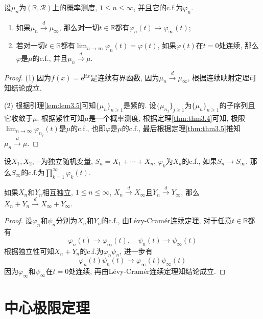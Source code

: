 \documentclass[cn, 12pt, math=mtpro2, bibstyle=apa, blue, twocol]{elegantbook}
\newcommand{\R}{\mathbb{R}}
\newcommand{\limn}{\lim_{n\to\infty}}
\begin{document}
\begin{theorem}
  设$\mu_n$为$(\R,\mathcal{R})$上的概率测度, $1\leq n\leq\infty$, 并且它的c.f.为$\varphi_n$.
  \begin{enumerate}[label=(\arabic*)]
  \item 如果$\mu_n\xrightarrow{d}\mu_\infty$, 那么对一切$t\in\R$都有$\varphi_n(t)\to \varphi_\infty(t)$;
  \item 若对一切$t\in\R$都有$\limn \varphi_n(t)=\varphi(t)$, 如果$\varphi(t)$在$t=0$处连续, 那么$\varphi$是$\mu$的c.f., 并且$\mu_n\xrightarrow{d}\mu$.
\end{enumerate}
\end{theorem}
\begin{proof}
  (1) 因为$f(x)=\text{e}^{\text{i}tx}$是连续有界函数, 因为$\mu_n\xrightarrow{d}\mu_\infty$, 根据连续映射定理可知结论成立.

  (2) 根据引理\ref{lem:lem3.5}可知$\{\mu_n\}_{n\ge1}$是紧的. 设$\{\mu_{n_j}\}_{j\ge1}$为$\{\mu_n\}_{n\ge1}$的子序列且它收敛于$\mu$. 根据紧性可知$\mu$是一个概率测度, 根据定理\ref{thm:thm3.4}可知, 极限$\limn \varphi_{n_j}(t)$是$\mu$的c.f., 也即$\varphi$是$\mu$的c.f., 最后根据定理\ref{thm:thm3.5}推知$\mu_n\xrightarrow{d}\mu$.
\end{proof}
\begin{example}
设$X_1,X_2,\cdots$为独立随机变量, $S_n=X_1+\cdots+X_n$, $\varphi_k$为$X_k$的c.f., 如果$S_n\to S_\infty$, 那么$S_\infty$的c.f.为$\prod_{k=1}^{\infty}\varphi_k(t)$.
\end{example}

\begin{example}
如果$X_n$和$Y_n$相互独立, $1\leq n\leq \infty$,  $X_n\xrightarrow{d}X_\infty$且$Y_n\xrightarrow{d}Y_\infty$, 那么$X_n+Y_n\xrightarrow{d}X_\infty+Y_\infty$.
\end{example}
\begin{proof}
  设$\varphi_n$和$\psi_n$分别为$X_n$和$Y_n$的c.f., 由Lévy-Cramér连续定理, 对于任意$t\in\R$都有
  $$\varphi_n(t)\to\varphi_\infty(t),\quad \psi_n(t)\to\psi_\infty(t)$$
  根据独立性可知$X_n+Y_n$的c.f.为$\varphi_n\psi_n$, 进一步有
  $$\varphi_n(t)\psi_n(t)\to\varphi_\infty(t)\psi_\infty(t)$$
  因为$\varphi_\infty$和$\psi_\infty$在$t=0$处连续, 再由Lévy-Cramér连续定理知结论成立.
\end{proof}
\section{中心极限定理}
\end{document}
